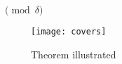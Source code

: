 \documentclass{article}
\newcommand{\pdelta}{\pmod{\delta}}
\begin{document}
$\pdelta$

\begin{figure}[hbt]
    \begin{center}
        \texttt{[image: covers]} %
    \end{center}
    \caption{Theorem illustrated}\label{F:Theorem}
\end{figure}
\end{document}
